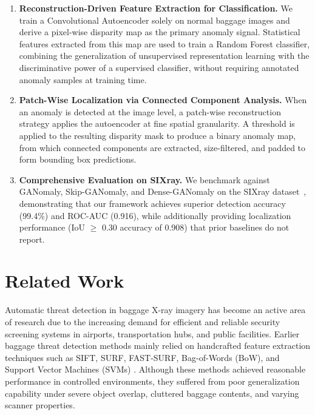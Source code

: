 \documentclass{bmvc2k}
\begin{document}
\begin{enumerate}
	\item \textbf{Reconstruction-Driven Feature Extraction for Classification.} We 
	train a Convolutional Autoencoder solely on normal baggage images and derive a 
	pixel-wise disparity map as the primary anomaly signal. Statistical features 
	extracted from this map are used to train a Random Forest classifier, combining 
	the generalization of unsupervised representation learning with the 
	discriminative power of a supervised classifier, without requiring annotated 
	anomaly samples at training time.
	
	\item \textbf{Patch-Wise Localization via Connected Component Analysis.} When 
	an anomaly is detected at the image level, a patch-wise reconstruction strategy 
	applies the autoencoder at fine spatial granularity. A threshold is applied to 
	the resulting disparity mask to produce a binary anomaly map, from which 
	connected components are extracted, size-filtered, and padded to form 
	bounding box predictions.
	
	\item \textbf{Comprehensive Evaluation on SIXray.} We benchmark against 
	GANomaly, Skip-GANomaly, and Dense-GANomaly on the SIXray dataset~\cite{sixray2019lingxi}, 
	demonstrating that our framework achieves superior detection accuracy (99.4\%) 
	and ROC-AUC (0.916), while additionally providing localization performance 
	(IoU $\geq$ 0.30 accuracy of 0.908) that prior baselines do not report.
\end{enumerate}


\section{Related Work}

Automatic threat detection in baggage X-ray imagery has become an active area of research due to the increasing demand for efficient and reliable security screening systems in airports, transportation hubs, and public facilities. Earlier baggage threat detection methods mainly relied on handcrafted feature extraction techniques such as SIFT, SURF, FAST-SURF, Bag-of-Words (BoW), and Support Vector Machines (SVMs) \cite{bastan2011,riffo2015,mery2016,kundegorski2016}. Although these methods achieved reasonable performance in controlled environments, they suffered from poor generalization capability under severe object overlap, cluttered baggage contents, and varying scanner properties.
\end{document}
